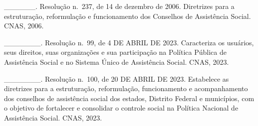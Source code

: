 \documentclass[
  letterpaper,
  DIV=11,
  numbers=noendperiod]{scrreprt}
\begin{document}
\_\_\_\_\_\_. Resolução n.~237, de 14 de dezembro de 2006. Diretrizes
para a estruturação, reformulação e funcionamento dos Conselhos de
Assistência Social. CNAS, 2006.

\_\_\_\_\_\_\_. Resolução n.~99, de 4 DE ABRIL DE 2023. Caracteriza os
usuários, seus direitos, suas organizações e sua participação na
Política Pública de Assistência Social e no Sistema Único de Assistência
Social. CNAS, 2023.

\_\_\_\_\_\_\_. Resolução n.~100, de 20 DE ABRIL DE 2023. Estabelece as
diretrizes para a estruturação, reformulação, funcionamento e
acompanhamento dos conselhos de assistência social dos estados, Distrito
Federal e municípios, com o objetivo de fortalecer e consolidar o
controle social na Política Nacional de Assistência Social. CNAS, 2023.
\end{document}
